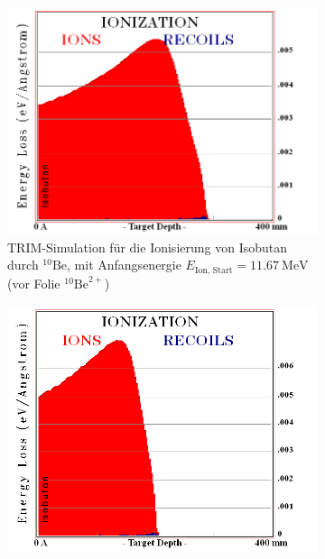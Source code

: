 \begin{figure}[H]
    \centering
    \begin{subfigure}[t]{0.47\textwidth}
        \centering
        \includegraphics[height=0.25\textheight]{Pictures/TRIM_Ionisierung_10Be_in_Isobutan_vorher_2+.png}
        \caption{TRIM-Simulation für die Ionisierung von Isobutan durch $^{10}\text{Be}$, mit Anfangsenergie $E_{\text{Ion, Start}} = \SI{11.67}{\mega\electronvolt}$ (vor Folie $^{10}\text{Be}^{2+}$)}
        \label{Auswertung_Gasdetektor_TRIM_sims_Be}
    \end{subfigure}
    \begin{subfigure}[t]{0.47\textwidth}
        \centering
        \includegraphics[height=0.25\textheight]{Pictures/TRIM_Ionisierung_10Bor_in_Isobutan_vorher_2+.png}

\end{subfigure}
\end{figure}
